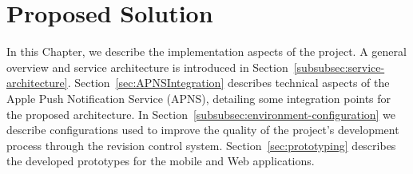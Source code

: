 \chapter{Proposed Solution}
\label{implementation}
\thispagestyle{plain}

In this Chapter, we describe the implementation aspects of the project. A general overview and service architecture is introduced in Section~\ref{subsubsec:service-architecture}. Section~\ref{sec:APNSIntegration} describes technical aspects of the Apple Push Notification Service (APNS), detailing some integration points for the proposed architecture. In Section~\ref{subsubsec:environment-configuration} we describe configurations used to improve the quality of the project's development process through the revision control system. Section~\ref{sec:prototyping} describes the developed prototypes for the mobile and Web applications.

